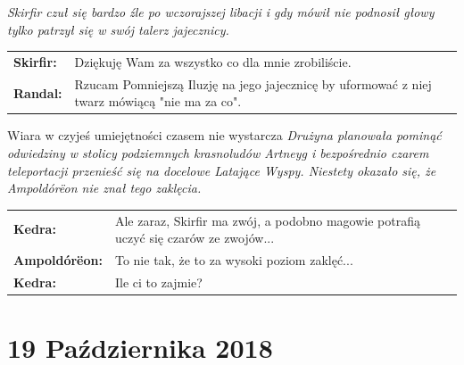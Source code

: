 \documentclass[10pt,twoside,twocolumn]{book}
\begin{document}
\begin{rpg-quotebox}{}
   \textit{Skirfir czuł się bardzo źle po wczorajszej libacji i gdy mówił nie podnosił głowy tylko patrzył się w swój talerz jajecznicy.}\\

   \begin{tabularx}{\columnwidth}{lX}
      \textbf{Skirfir:} & Dziękuję Wam za wszystko co dla mnie zrobiliście.\\
      \textbf{Randal:} & Rzucam Pomniejszą Iluzję na jego jajecznicę by uformować z niej twarz mówiącą "nie ma za co".\\
   \end{tabularx}
\end{rpg-quotebox}


\begin{rpg-quotebox}{Wiara w czyjeś umiejętności czasem nie wystarcza}
   \textit{Drużyna planowała pominąć odwiedziny w stolicy podziemnych krasnoludów Artneyg i bezpośrednio czarem teleportacji przenieść się na docelowe Latające Wyspy. Niestety okazało się, że Ampoldórëon nie znał tego zaklęcia.}\\

   \begin{tabularx}{\columnwidth}{lX}
      \textbf{Kedra:} & Ale zaraz, Skirfir ma zwój, a podobno magowie potrafią uczyć się czarów ze zwojów...\\
      \textbf{Ampoldórëon:} & To nie tak, że to za wysoki poziom zaklęć...\\
      \textbf{Kedra:} & Ile ci to zajmie?\\
   \end{tabularx}
\end{rpg-quotebox}

\section*{19 Października 2018}
\end{document}

